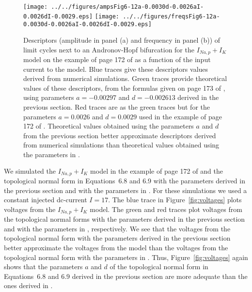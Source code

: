\documentclass{article}
\theoremstyle{lemma}
\begin{document}
\begin{center}
\begin{figure}
\texttt{[image: ../../figures/ampsFig6-12a-0.0030d-0.0026aI-0.0026dI-0.0029.eps]}
\texttt{[image: ../../figures/freqsFig6-12a-0.0030d-0.0026aI-0.0026dI-0.0029.eps]}

\caption{Descriptors (amplitude in panel (a) and frequency in panel (b)) of
limit cycles next to an Andronov-Hopf bifurcation for the $I_{Na,p}+I_K$ model
on the example of page 172 of \citet{izhikevich07} as a function of the input
current to the model. Blue traces give these descriptors values derived from
numerical simulations. Green traces provide theoretical values of these
descriptors, from the formulas given on page 173 of \citet{izhikevich07},
using parameters $a=-0.00297$ and $d=-0.002613$ derived in the previous
section. Red traces are as the green traces but for the parameters $a=0.0026$
and $d=0.0029$ used in the example of page 172 of \citet{izhikevich07}.
Theoretical values obtained using the parameters $a$ and $d$
from the previous section better approximate descriptors derived from
numerical simulations than theoretical values obtained using the parameters in
\citet{izhikevich07}.}

\label{fig:ampsAndFreqsVsIs} 
\end{figure} 
\end{center}

We simulated the $I_{Na,p}+I_K$ model in the example of page 172 of
\citet{izhikevich07} and the topological normal form in Equations~6.8 and 6.9 with the parameters
derived in the previous section and with the parameters in
\citet{izhikevich07}. For these simulations we used a constant injected
dc-current $I=17$.
%
The blue trace in Figure~\ref{fig:voltages} plots voltages from
the $I_{Na,p}+I_K$ model. The green and red traces plot voltages from the 
topological normal forms with the parameters derived in the previous section
and with the parameters in \citet{izhikevich07}, respectively. We see that the
voltages from the topological normal form with the parameters derived in the
previous section better approximate the voltages from the model than the
voltages from the topological normal form with the parameters in
\citet{izhikevich07}.
%
Thus, Figure~\ref{fig:voltages} again shows that the parameters $a$ and $d$ of
the topological normal form in Equations~6.8 and 6.9 derived in the previous
section are more adequate than the ones derived in \citet{izhikevich07}.
\end{document}
